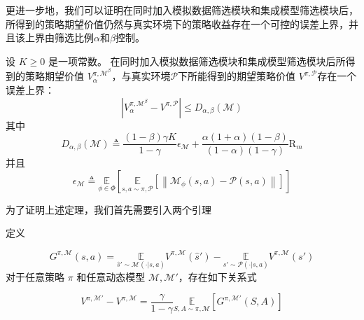 更进一步地，我们可以证明在同时加入模拟数据筛选模块和集成模型筛选模块后，所得到的策略期望价值仍然与真实环境下的策略收益存在一个可控的误差上界，并且该上界由筛选比例$\alpha$和$\beta$控制。

\begin{theorem}\label{the:MBDP-bound}

设 $K\geq 0$ 是一项常数。 在同时加入模拟数据筛选模块和集成模型筛选模块后所得到的策略期望价值 ${V}_\alpha^{\pi, \mathcal{M}^\beta}$，与真实环境$\mathcal{P}$下所能得到的期望策略价值 ${V}^{\pi, \mathcal{P}}$存在一个误差上界：
\begin{equation}
\left|{V}_\alpha^{\pi, \mathcal{M}^\beta}-{V}^{\pi, \mathcal{P}}\right|\leq D_{\alpha,\beta}(\mathcal{M})
\end{equation}
其中
\begin{equation}\label{eq:MBDP-bound}
D_{\alpha,\beta}(\mathcal{M})\triangleq\frac{(1-\beta)\gamma K}{1-\gamma}\epsilon_{\mathcal{M}}+\frac{\alpha(1+\alpha)(1-\beta)}{(1-\alpha)(1-\gamma)}\mathrm{R}_m
\end{equation}
并且
\begin{equation}\label{def:delta-M}
\epsilon_{\mathcal{M}}\triangleq\underset{\phi\in\Phi}{\mathbb{E}}\left[\underset{s,a\sim \pi,\mathcal{P}}{\mathbb{E}}\left[\left\|\mathcal{M}_\phi(s, a)-\mathcal{P}(s, a)\right\|\right]\right]
\end{equation}

\end{theorem}
为了证明上述定理，我们首先需要引入两个引理

\begin{lemma}\label{lem:proof-for-lem41}

定义

\begin{equation}\label{def:G-sa}
G^{\pi,\mathcal{M}}(s,a)=\underset{\hat{s}'\sim\mathcal{M}(\cdot|s,a)}{\mathbb{E}}{{V}^{\pi,\mathcal{M}}}(\hat{s}') - \underset{s'\sim\mathcal{P}(\cdot|s,a)}{\mathbb{E}}{{V}^{\pi,\mathcal{M}}}(s')
\end{equation}
对于任意策略 $\pi$ 和任意动态模型 $\mathcal{M},\mathcal{M}'$，存在如下关系式

\begin{equation}
{V}^{\pi,\mathcal{M}'} - {V}^{\pi,\mathcal{M}} = \frac{\gamma}{1-\gamma}\underset{S,A\sim\pi,\mathcal{M}}{\mathbb{E}}\left[G^{\pi,\mathcal{M}'}(S,A)\right]
\end{equation}

\end{lemma}

